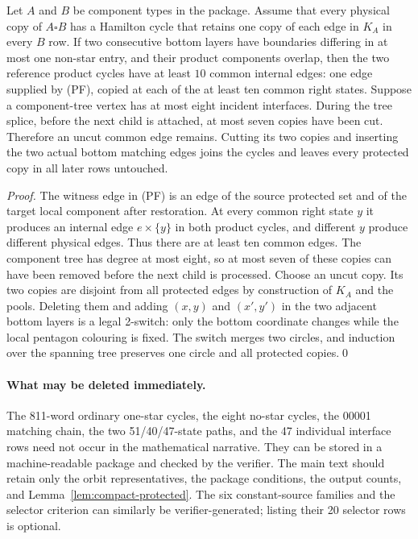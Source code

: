 \begin{lemma}\label{lem:compact-protected}
Let $A$ and $B$ be component types in the package.  Assume that every
physical copy of $A\square B$ has a Hamilton cycle that retains one copy
of each edge in $K_A$ in every $B$ row.  If two consecutive bottom layers
have boundaries differing in at most one non-star entry, and their product
components overlap, then the two reference product cycles have at least
$10$ common internal edges: one edge supplied by (PF), copied at each of
the at least ten common right states.  Suppose a component-tree vertex has
at most eight incident interfaces.  During the tree splice, before the
next child is attached, at most seven copies have been cut.  Therefore an
uncut common edge remains.  Cutting its two copies and inserting the two
actual bottom matching edges joins the cycles and leaves every protected
copy in all later rows untouched.
\end{lemma}

\begin{proof}
The witness edge in (PF) is an edge of the source protected set and of the target local
component after restoration.  At every common right state $y$ it produces
an internal edge $e\times\{y\}$ in both product cycles, and different $y$
produce different physical edges.  Thus there are at least ten common
edges.  The component tree has degree at most eight, so at most seven of
these copies can have been removed before the next child is processed.
Choose an uncut copy.  Its two copies are disjoint from all protected
edges by construction of $K_A$ and the pools.  Deleting them and adding
$(x,y)$ and $(x',y')$ in the two adjacent bottom layers is a legal
2-switch: only the bottom coordinate changes while the local pentagon
colouring is fixed.  The switch merges two circles, and induction over the
spanning tree preserves one circle and all protected copies.\qed
\end{proof}

\paragraph{What may be deleted immediately.}
The 811-word ordinary one-star cycles, the eight no-star cycles, the
00001 matching chain, the two 51/40/47-state paths, and the 47 individual
interface rows need not occur in the mathematical narrative.  They can be
stored in a machine-readable package and checked by the verifier.  The
main text should retain only the orbit representatives, the package
conditions, the output counts, and Lemma~\ref{lem:compact-protected}.
The six constant-source families and the selector criterion can similarly
be verifier-generated; listing their 20 selector rows is optional.

